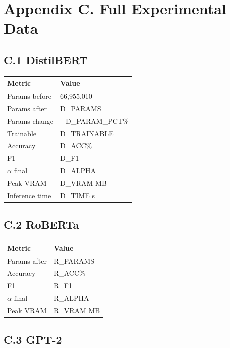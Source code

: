 \section{Appendix C. Full Experimental Data}

\subsection{C.1 DistilBERT}

\begin{table}[H]
\centering
\small
\begin{tabular}{ll}
\toprule
\textbf{Metric} & \textbf{Value} \\
\midrule
Params before & 66,955,010 \\
Params after & {{D\_PARAMS}} \\
Params change & +{{D\_PARAM\_PCT}}\% \\
Trainable & {{D\_TRAINABLE}} \\
Accuracy & {{D\_ACC}}\% \\
F1 & {{D\_F1}} \\
$\alpha$ final & {{D\_ALPHA}} \\
Peak VRAM & {{D\_VRAM}} MB \\
Inference time & {{D\_TIME}} s \\
\bottomrule
\end{tabular}
\end{table}

\subsection{C.2 RoBERTa}

\begin{table}[H]
\centering
\small
\begin{tabular}{ll}
\toprule
\textbf{Metric} & \textbf{Value} \\
\midrule
Params after & {{R\_PARAMS}} \\
Accuracy & {{R\_ACC}}\% \\
F1 & {{R\_F1}} \\
$\alpha$ final & {{R\_ALPHA}} \\
Peak VRAM & {{R\_VRAM}} MB \\
\bottomrule
\end{tabular}
\end{table}

\subsection{C.3 GPT-2}

